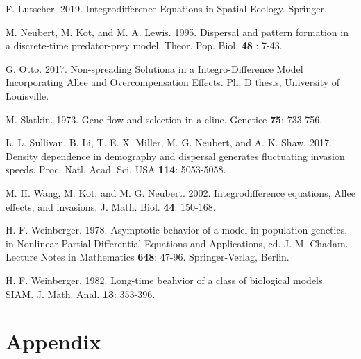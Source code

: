 \documentclass[11pt]{article}
\theoremstyle{definition}
\numberwithin{equation}{section}
\numberwithin{thm}{section}
\begin{document}
\begin{thebibliography}{9}
F. Lutscher. 2019. Integrodifference Equations in Spatial Ecology.  Springer.


 M. Neubert, M. Kot, and M. A. Lewis. 1995. Dispersal and pattern formation in a
discrete-time predator-prey model. Theor. Pop. Biol. {\bf 48}
: 7-43.

 G. Otto. 2017. Non-spreading Solutiona in a Integro-Difference Model Incorporating Allee and Overcompensation Effects. Ph. D thesis, University of Louisville.

 M. Slatkin. 1973. Gene flow and selection in a cline.
Genetice {\bf 75}: 733-756.



 L. L. Sullivan, B. Li, T. E. X. Miller, M. G. Neubert, and A. K. Shaw. 2017.
Density dependence in demography and dispersal generates fluctuating invasion speeds. Proc. Natl. Acad. Sci. USA {\bf
114}: 5053-5058.


 M. H. Wang, M. Kot, and M. G. Neubert. 2002. Integrodifference equations, Allee effects, and
invasions. J. Math. Biol. {\bf 44}: 150-168.

 H. F. Weinberger. 1978. Asymptotic behavior of a model in  population genetics,
in Nonlinear Partial Differential Equations  and Applications, ed.
J. M. Chadam. Lecture Notes in Mathematics {\bf 648}: 47-96.
Springer-Verlag, Berlin.

 H. F.  Weinberger. 1982. Long-time beahvior of a class of biological models. SIAM. J.
Math. Anal. {\bf 13}: 353-396.

\end{thebibliography}


\appendix

\section{Appendix}
\end{document}
